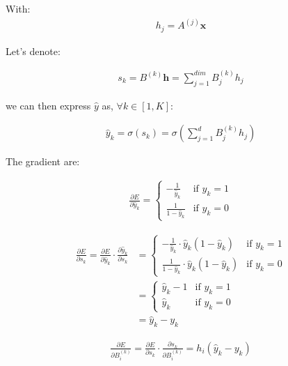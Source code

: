 With:
\begin{align}
	h_j = A^{(j)}\mathbf{x}
\end{align}


Let's denote:

\begin{align}
	s_k  = B^{(k)} \mathbf{h} = \sum_{j=1}^{\textit{dim}} B^{(k)}_j h_j 
\end{align}

we can then express $\hat y$ as, $\forall k \in [1, K]$:

\begin{align}
	\hat y_k  = \sigma(s_k) = \sigma( \sum_{j=1}^{d} B^{(k)}_j h_j) 
\end{align}


The gradient are:

\begin{align}
	\frac{ \partial E } { \partial \hat y_k } = 
		\left\{
		    \begin{array}{ll}
		        - \frac{1}{\hat y_k} & \mbox{if } y_k =1 \\
		        \frac{1}{1 - \hat y_k} & \mbox{if } y_k =0
		    \end{array}
		\right.
\end{align}


\begin{align}
	\frac{ \partial E } { \partial s_k } 
		=  
		\frac{ \partial E } { \partial \hat y_k } \cdot \frac{ \partial \hat y_k } { \partial s_k } 
		&=
		\left\{
		    \begin{array}{ll}
		        - \frac{1}{\hat y_k} \cdot \hat y_k (1 - \hat y_k)& \mbox{if } y_k =1 \\
		        \frac{1}{1 - \hat y_k} \cdot \hat y_k (1 - \hat y_k)& \mbox{if } y_k =0
		    \end{array}
		\right. \\
		&=
		\left\{
		    \begin{array}{ll}
		       \hat y_k - 1 & \mbox{if } y_k =1 \\
		       \hat y_k & \mbox{if } y_k =0
		    \end{array}
		\right. \\
		&= \hat y_k - y_k
\end{align}



\begin{align}
	\frac{\partial E}{\partial B_i^{(k)}} 
	= 
	\frac{\partial E}{\partial s_k} \cdot \frac{\partial s_k}{\partial B_i^{(k)}} 
	= 
	h_i (\hat y_k - y_k)
\end{align}


